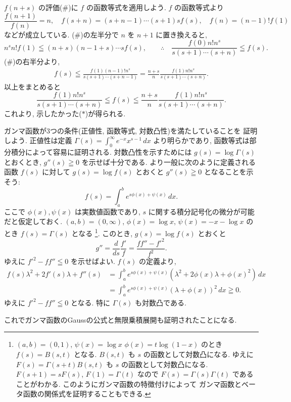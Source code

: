 \documentclass[12pt,twoside]{jarticle}
\theoremstyle{jplain}
\theoremstyle{jplain}
\theoremstyle{jplain}
\numberwithin{theorem}{section}
\numberwithin{equation}{section}
\numberwithin{figure}{section}
\numberwithin{table}{section}
\begin{document}
$f(n+s)$ の評価($\#$)に $f$ の函数等式を適用しよう. $f$ の函数等式より
\[
\frac{f(n+1)}{f(n)}=n, \quad
f(s+n)=(s+n-1)\cdots(s+1)sf(s), \quad
f(n)=(n-1)!f(1)
\]
などが成立している.
($\#$)の左半分で $n$ を $n+1$ に置き換えると,
\[
n^s n! f(1)\leqq (n+s)(n-1+s)\cdots s f(s),
\qquad\therefore\quad
\frac{f(0)n!n^s}{s(s+1)\cdots(s+n)}\leqq f(s).
\]
($\#$)の右半分より, 
\begin{align*}
f(s)\leqq \frac{f(1)(n-1)!n^s}{s(s+1)\cdots(s+n-1)}
=\frac{n+s}{n}\frac{f(1)n!n^s}{s(s+1)\cdots(s+n)}.
\end{align*}
以上をまとめると
\[
\frac{f(1)n!n^s}{s(s+1)\cdots(s+n)}
\leqq
f(s)
\leqq \frac{n+s}{n}
\frac{f(1)n!n^s}{s(s+1)\cdots(s+n)}.
\]
これより, 示したかった($*$)が得られる.

ガンマ函数が3つの条件(正値性, 函数等式, 対数凸性)を満たしていることを
証明しよう. 正値性は定義 $\Gamma(s)=\int_0^\infty e^{-x}x^{s-1}\,dx$ 
より明らかであり, 函数等式は部分積分によって容易に証明される.
対数凸性を示すためには $g(s)=\log\Gamma(s)$ とおくとき, 
$g''(s)\geqq 0$ を示せば十分である.
より一般に次のように定義される函数 $f(s)$ に対して $g(s)=\log f(s)$ 
とおくと $g''(s)\geqq 0$ となることを示そう:
\[
f(s)=\int_a^b e^{s\phi(x)+\psi(x)}\,dx.
\]
ここで $\phi(x),\psi(x)$ は実数値函数であり, 
$s$ に関する積分記号化の微分が可能だと仮定しておく.
$(a,b)=(0,\infty)$, $\phi(x)=\log x$, $\psi(x)=-x-\log x$ の
とき $f(s)=\Gamma(s)$ となる%
\footnote{$(a,b)=(0,1)$, $\psi(x)=\log x$ $\phi(x)=t\log(1-x)$ 
のとき $f(s)=B(s,t)$ となる. 
$B(s,t)$ も $s$ の函数として対数凸になる.
ゆえに $F(s)=\Gamma(s+t)B(s,t)$ も $s$ の函数として対数凸になる.
$F(s+1)=sF(s)$, $F(1)=\Gamma(t)$ なので $F(s)=\Gamma(s)\Gamma(t)$
であることがわかる. このようにガンマ函数の特徴付けによって
ガンマ函数とベータ函数の関係式を証明することもできる.}. 
このとき, $g(s)=\log f(s)$ とおくと
\[
g''
=\frac{d}{ds}\frac{f'}{f}
=\frac{ff''-f'^2}{f^2}.
\]
ゆえに $f'^2-ff''\leqq 0$ を示せばよい.
$f(s)$ の定義より,
\begin{align*}
f(s)\lambda^2+2f'(s)\lambda+f''(s)
&
=\int_a^b e^{s\phi(x)+\psi(x)}(\lambda^2+2\phi(x)\lambda+\phi(x)^2)\,dx
\\ &
=\int_a^b e^{s\phi(x)+\psi(x)}(\lambda+\phi(x))^2\,dx
\geqq 0.
\end{align*}
ゆえに $f'^2-ff''\leqq 0$ となる.
特に $\Gamma(s)$ も対数凸である.

これでガンマ函数のGaussの公式と無限乗積展開も証明されたことになる.
\end{document}
